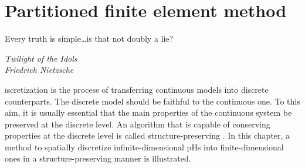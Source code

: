 \chapter{Partitioned finite element method}\label{ch:pfem}

\epigraph{Every truth is simple\dots is that not doubly a lie?}{\textit{Twilight of the Idols \\ Friedrich Nietzsche}}

\minitoc

\lettrine{\color{theme}{D}}iscretization is the process of transferring continuous models into discrete counterparts. The discrete model should be faithful to the continuous one. To this aim, it is usually essential that the main properties of the continuous system be preserved at the discrete level. An algorithm that is capable of conserving properties at the discrete level is called structure-preserving \cite{christiansen2011}. In this chapter, a method to spatially discretize infinite-dimensional pHs into finite-dimensional ones in a structure-preserving manner is illustrated.

